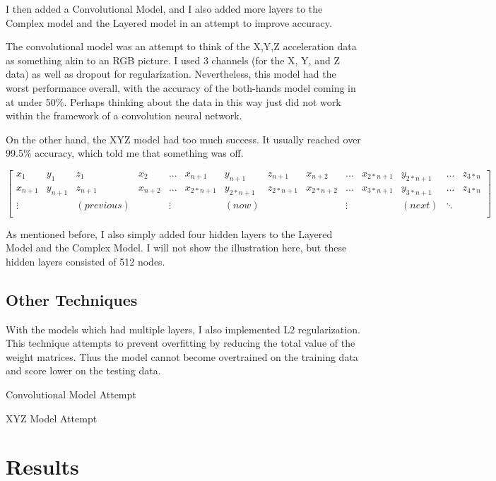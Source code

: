 \documentclass[]{report}
\begin{document}
I then added a Convolutional Model, and I also added more layers to the Complex model and the Layered model in an attempt to improve accuracy.

The convolutional model was an attempt to think of the X,Y,Z acceleration data as something akin to an RGB picture. I used 3 channels (for the X, Y, and Z data) as well as dropout for regularization. Nevertheless, this model had the worst performance overall, with the accuracy of the both-hands model coming in at under 50\%. Perhaps thinking about the data in this way just did not work within the framework of a convolution neural network.

On the other hand, the XYZ model had too much success. It usually reached over 99.5\% accuracy, which told me that something was off. 


$$
\left[
\begin{array}{cccccccccccccc}
x_{1} & y_{1} & z_{1} & x_{2} & ... & x_{n+1} & y_{n+1} & z_{n+1} & x_{n+2} & ... & x_{2*n+1} & y_{2*n+1} & ... & z_{3*n} \\
x_{n+1} & y_{n+1} & z_{n+1} & x_{n+2} & ... & x_{2*n+1} & y_{2*n+1} & z_{2*n+1} & x_{2*n+2} & ... & x_{3*n+1} & y_{3*n+1} & ... & z_{4*n} \\
\vdots & & (previous) & & \vdots & & (now) & &  & \vdots & & (next) & \ddots\\
\end{array}
\right]
$$

As mentioned before, I also simply added four hidden layers to the Layered Model and the Complex Model. I will not show the illustration here, but these hidden layers consisted of 512 nodes. 

\section{Other Techniques}

With the models which had multiple layers, I also implemented L2 regularization. This technique attempts to prevent overfitting by reducing the total value of the weight matrices. Thus the model cannot become overtrained on the training data and score lower on the testing data.

Convolutional Model Attempt

XYZ Model Attempt

\chapter{Results}
\end{document}
